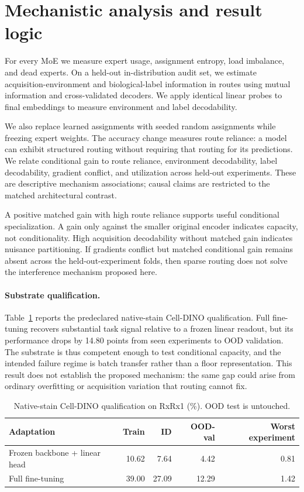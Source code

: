 \section{Mechanistic analysis and result logic}

For every MoE we measure expert usage, assignment entropy, load imbalance, and dead experts. On a
held-out in-distribution audit set, we estimate acquisition-environment and biological-label
information in routes using mutual information and cross-validated decoders. We apply identical
linear probes to final embeddings to measure environment and label decodability.

We also replace learned assignments with seeded random assignments while freezing expert weights.
The accuracy change measures route reliance: a model can exhibit structured routing without
requiring that routing for its predictions. We relate conditional gain to route reliance,
environment decodability, label decodability, gradient conflict, and utilization across held-out
experiments. These are descriptive mechanism associations; causal claims are restricted to the
matched architectural contrast.

A positive matched gain with high route reliance supports useful conditional specialization. A
gain only against the smaller original encoder indicates capacity, not conditionality. High
acquisition decodability without matched gain indicates nuisance partitioning. If gradients
conflict but matched conditional gain remains absent across the held-out-experiment folds, then
sparse routing does not solve the interference mechanism proposed here.

\paragraph{Substrate qualification.}
Table~\ref{tab:native-competence} reports the predeclared native-stain Cell-DINO qualification.
Full fine-tuning recovers substantial task signal relative to a frozen linear readout, but its
performance drops by 14.80 points from seen experiments to OOD validation. The substrate is thus
competent enough to test conditional capacity, and the intended failure regime is batch transfer
rather than a floor representation. This result does not establish the proposed mechanism: the
same gap could arise from ordinary overfitting or acquisition variation that routing cannot fix.

\begin{table}[t]
  \centering
  \caption{Native-stain Cell-DINO qualification on RxRx1 (\%). OOD test is untouched.}
  \label{tab:native-competence}
  \begin{tabular}{lrrrr}
    \toprule
    Adaptation & Train & ID & OOD-val & Worst experiment \\
    \midrule
    Frozen backbone + linear head & 10.62 & 7.64 & 4.42 & 0.81 \\
    Full fine-tuning & 39.00 & 27.09 & 12.29 & 1.42 \\
    \bottomrule
  \end{tabular}
\end{table}

